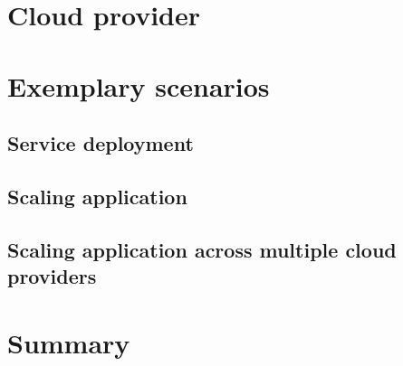 \section{Cloud provider}

\section{Exemplary scenarios}

\subsection{Service deployment}

\subsection{Scaling application}

\subsection{Scaling application across multiple cloud providers}

\section{Summary}

